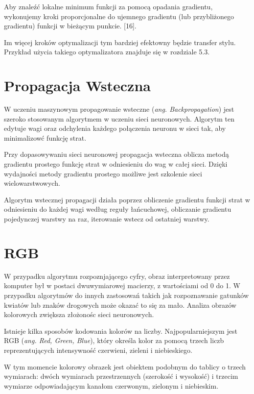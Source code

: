 \documentclass[brudnopis]{xmgr}
\begin{document}
Aby znaleźć lokalne minimum funkcji za pomocą opadania gradientu, wykonujemy kroki proporcjonalne do ujemnego gradientu (lub przybliżonego gradientu) funkcji w bieżącym punkcie.  [16]. 

Im więcej kroków optymalizacji tym bardziej efektowny będzie transfer stylu.
Przykład użycia takiego optymalizatora znajduje się w rozdziale 5.3.

\section{Propagacja Wsteczna\label{s:dsssl}}

W uczeniu maszynowym propagowanie wsteczne (\textit{ang. Backpropagation}) jest szeroko stosowanym algorytmem w uczeniu sieci neuronowych. Algorytm ten edytuje wagi oraz odchylenia każdego połączenia neuronu w sieci tak, aby minimalizowć funkcję strat.

Przy dopasowywaniu sieci neuronowej propagacja wsteczna oblicza metodą gradientu prostego funkcję strat w odniesieniu do wag w całej sieci. Dzięki wydajności metody gradientu prostego możliwe jest szkolenie sieci wielowarstwowych.

Algorytm wstecznej propagacji działa poprzez obliczenie gradientu funkcji strat w odniesieniu do każdej wagi według reguły łańcuchowej, obliczanie gradientu pojedynczej warstwy na raz, iterowanie wstecz od ostatniej warstwy. 


 \section{RGB\label{s:dsssl}}
 
 W przypadku algorytmu rozpoznjającego cyfry, obraz interpretowany przez komputer był w postaci dwuwymiarowej macierzy, z wartościami od 0 do 1. W przypadku algorytmów do innych zastosowań takich jak rozpoznawanie gatunków kwiatów lub znaków drogowych może okazać to się za mało. Analiza obrazów kolorowych zwiększa złożonośc sieci neuronowych. 
 
Istnieje kilka sposobów kodowania kolorów na liczby. Najpopularniejszym jest
RGB (\textit{ang. Red, Green, Blue}), który określa kolor za pomocą trzech liczb reprezentujących intensywność czerwieni, zieleni i niebieskiego. 

W tym momencie kolorowy obrazek jest obiektem podobnym do tablicy o trzech wymiarach: dwóch wymiarach przestrzennych (szerokość i wysokość) i trzecim wymiarze odpowiadającym kanałom czerwonym, zielonym i niebieskim. 
\end{document}
